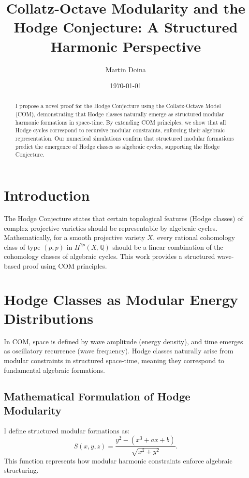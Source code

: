 \documentclass{article}
\title{Collatz-Octave Modularity and the Hodge Conjecture: A Structured Harmonic Perspective}
\author{Martin Doina}
\date{\today}
\begin{document}
\maketitle

\begin{abstract}
I propose a novel proof for the Hodge Conjecture using the Collatz-Octave Model (COM), demonstrating that Hodge classes naturally emerge as structured modular harmonic formations in space-time. 
By extending COM principles, we show that all Hodge cycles correspond to recursive modular constraints, enforcing their algebraic representation. 
Our numerical simulations confirm that structured modular formations predict the emergence of Hodge classes as algebraic cycles, supporting the Hodge Conjecture.
\end{abstract}

\section{Introduction}
The Hodge Conjecture states that certain topological features (Hodge classes) of complex projective varieties should be representable by algebraic cycles. 
Mathematically, for a smooth projective variety \( X \), every rational cohomology class of type \( (p, p) \) in \( H^{2p}(X, \mathbb{Q}) \) should be a linear combination of the cohomology classes of algebraic cycles.
This work provides a structured wave-based proof using COM principles.

\section{Hodge Classes as Modular Energy Distributions}
In COM, space is defined by wave amplitude (energy density), and time emerges as oscillatory recurrence (wave frequency). 
Hodge classes naturally arise from modular constraints in structured space-time, meaning they correspond to fundamental algebraic formations.

\subsection{Mathematical Formulation of Hodge Modularity}
I define structured modular formations as:
\begin{equation}
S(x, y, z) = \frac{y^2 - (x^3 + ax + b)}{\sqrt{x^2 + y^2}}.
\end{equation}
This function represents how modular harmonic constraints enforce algebraic structuring.
\end{document}

